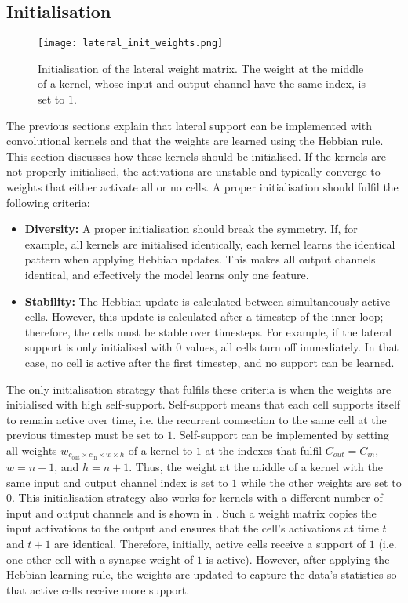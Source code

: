 \subsection{Initialisation}
\begin{figure}[h]
    \centering
    \texttt{[image: lateral\_init\_weights.png]}
    \caption[Initialisation of the lateral weight matrix]{Initialisation of the lateral weight matrix. The weight at the middle of a kernel, whose input and output channel have the same index, is set to $1$.}
\end{figure}
The previous sections explain that lateral support can be implemented with convolutional kernels and that the weights are learned using the Hebbian rule.
This section discusses how these kernels should be initialised.
If the kernels are not properly initialised, the activations are unstable and typically converge to weights that either activate all or no cells.
A proper initialisation should fulfil the following criteria:

\begin{itemize}
    \item \textbf{Diversity:} A proper initialisation should break the symmetry. If, for example, all kernels are initialised identically, each kernel learns the identical pattern when applying Hebbian updates. This makes all output channels identical, and effectively the model learns only one feature.
    \item \textbf{Stability:} The Hebbian update is calculated between simultaneously active cells. However, this update is calculated after a timestep of the inner loop; therefore, the cells must be stable over timesteps. For example, if the lateral support is only initialised with $0$ values, all cells turn off immediately. In that case, no cell is active after the first timestep, and no support can be learned.
\end{itemize}

The only initialisation strategy that fulfils these criteria is when the weights are initialised with high self-support.
Self-support means that each cell supports itself to remain active over time, i.e. the recurrent connection to the same cell at the previous timestep must be set to $1$.
Self-support can be implemented by setting all weights $w_{c_{\text{out}} \times c_{\text{in}} \times w \times h}$ of a kernel to $1$ at the indexes that fulfil 
$C_{out} = C_{in}$, $w = n+1$, and $h = n+1$. Thus, the weight at the middle of a kernel with the same input and output channel index is set to $1$ while the other weights are set to $0$. This initialisation strategy also works for kernels with a different number of input and output channels and is shown in .
Such a weight matrix copies the input activations to the output and ensures that the cell's activations at time $t$ and $t+1$ are identical. Therefore, initially, active cells receive a support of $1$ (i.e. one other cell with a synapse weight of $1$ is active).
However, after applying the Hebbian learning rule, the weights are updated to capture the data's statistics so that active cells receive more support.

